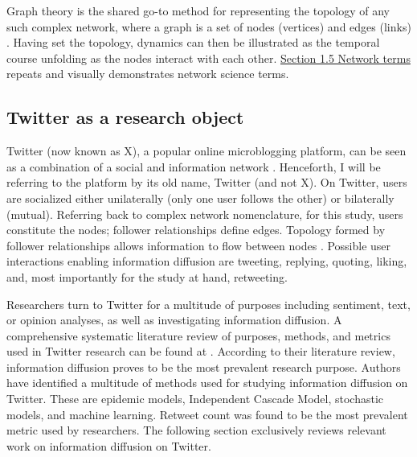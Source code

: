 \documentclass[11pt,a4paper]{article}
\begin{document}
Graph theory is the shared go-to method for representing the topology of any such complex network, where a graph is a set of nodes (vertices) and edges (links) \cite{boccaletti_complex_2006}. Having set the topology, dynamics can then be illustrated as the temporal course unfolding as the nodes interact with each other. \hyperlink{sec:network-terms}{Section 1.5 Network terms} repeats and visually demonstrates network science terms.

    \subsection{Twitter as a research object}
    Twitter (now known as X), a popular online microblogging platform, can be seen as a combination of a social and information network \cite{myers_information_2014, kwak_what_2010}. Henceforth, I will be referring to the platform by its old name, Twitter (and not X). On Twitter, users are socialized either unilaterally (only one user follows the other) or bilaterally (mutual). Referring back to complex network nomenclature, for this study, users constitute the nodes; follower relationships define edges. Topology formed by follower relationships allows information to flow between nodes \cite{myers_information_2014}. Possible user interactions enabling information diffusion are tweeting, replying, quoting, liking, and, most importantly for the study at hand, retweeting.  
    
    Researchers turn to Twitter for a multitude of purposes including sentiment, text, or opinion analyses, as well as investigating information diffusion. A comprehensive systematic literature review of purposes, methods, and metrics used in Twitter research can be found at \cite{firdaniza_information_2021}. According to their literature review, information diffusion proves to be the most prevalent research purpose. Authors have identified a multitude of methods used for studying information diffusion on Twitter. These are epidemic models, Independent Cascade Model, stochastic models, and machine learning. Retweet count was found to be the most prevalent metric used by researchers. The following section exclusively reviews relevant work on information diffusion on Twitter.
\end{document}
